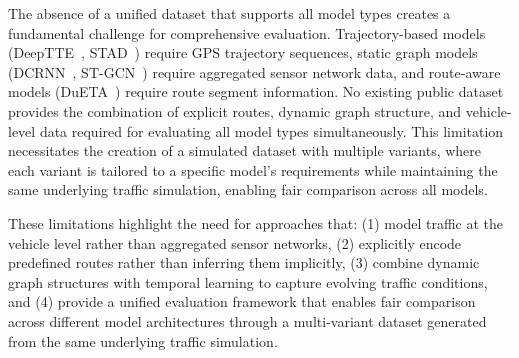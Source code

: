 The absence of a unified dataset that supports all model types creates a fundamental challenge for comprehensive evaluation. Trajectory-based models (DeepTTE~\cite{deepTTE2018}, STAD~\cite{abbar2020stad}) require GPS trajectory sequences, static graph models (DCRNN~\cite{dcrnn2018}, ST-GCN~\cite{yu2018stgcn}) require aggregated sensor network data, and route-aware models (DuETA~\cite{dueta2023}) require route segment information. No existing public dataset provides the combination of explicit routes, dynamic graph structure, and vehicle-level data required for evaluating all model types simultaneously. This limitation necessitates the creation of a simulated dataset with multiple variants, where each variant is tailored to a specific model's requirements while maintaining the same underlying traffic simulation, enabling fair comparison across all models.

These limitations highlight the need for approaches that: (1) model traffic at the vehicle level rather than aggregated sensor networks, (2) explicitly encode predefined routes rather than inferring them implicitly, (3) combine dynamic graph structures with temporal learning to capture evolving traffic conditions, and (4) provide a unified evaluation framework that enables fair comparison across different model architectures through a multi-variant dataset generated from the same underlying traffic simulation.


